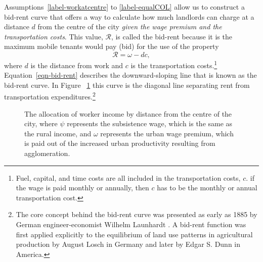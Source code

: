 Assumptions~\ref{label-workatcentre}  to \ref{label-equalCOL} allow us to construct a \gls{bid-rent curve} that offers a way to calculate how much landlords can charge at a distance $d$ from the centre of the city \emph{given the wage premium and the transportation costs}. This value, $\mathcal{R}$, is called the bid-rent because it is the maximum mobile tenants would pay (bid) for the use of the property
\begin{equation}  
\mathcal{R}= \omega - dc, \label{eqn-bid-rent}\end{equation} 
where $d$ is the distance from work and $c$ is the transportation costs.\footnote{Fuel, capital, and time costs are all included in the transportation costs, ${c}$.  if the wage is paid monthly or annually, then $c$ has to be the monthly or annual transportation cost.} Equation~\ref{eqn-bid-rent} describes the downward-sloping line that is known as the bid-rent curve. In Figure ~\ref{fig-alonso-simple} this curve is the diagonal line separating rent from transportation expenditures.\footnote{The core concept behind the bid-rent curve was presented as early as 1885  by German engineer-economist Wilhelm Launhardt \cite{blaugEconomicTheoryRetrospect1985, launhardtMathematischeBegruendungVolkswirthschaftslehre1885}. A \gls{bid-rent function} was first applied explicitly to the equilibrium of land use patterns in agricultural production by August Losch \cite{loschEconomicsLocation1954} in Germany and later by Edgar S. Dunn \cite{dunnEquilibriumLandUsePatterns1954} in America. }

\begin{figure}[!ht]
    \begin{center}
    
    \caption[The allocation of worker income by distance from the centre of the city.]{The allocation of worker income by distance from the centre of the city, where $\psi$ represents the \gls{subsistence wage}, which is the same as the rural income, and $\omega$ represents the \gls{urban wage premium}, which is paid out of the increased urban productivity resulting from agglomeration.}
    \label{fig-alonso-simple}
    \end{center}
\end{figure}

